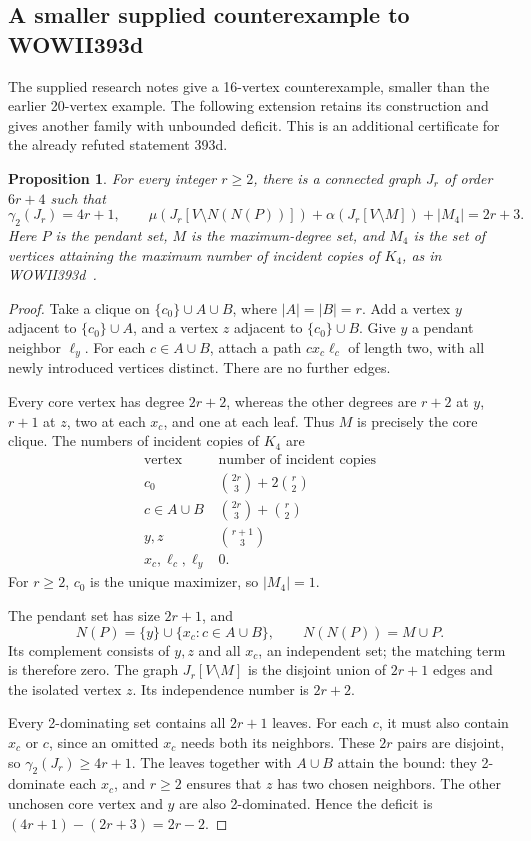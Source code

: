 \documentclass[11pt,a4paper]{article}
\newtheorem{proposition}[theorem]{Proposition}
\theoremstyle{remark}
\begin{document}
\subsection{A smaller supplied counterexample to WOWII393d}
\label{r7:393d}

The supplied research notes give a 16-vertex counterexample, smaller than
the earlier 20-vertex example. The following extension retains its
construction and gives another family with unbounded deficit. This is
an additional certificate for the already refuted statement 393d.

\begin{proposition}\label{r7:family393d}
For every integer $r\ge2$, there is a connected graph $J_r$ of order
$6r+4$ such that
\[
 \gamma_2(J_r)=4r+1,
 \qquad
 \mu(J_r[V\setminus N(N(P))])+\alpha(J_r[V\setminus M])+|M_4|
 =2r+3.
\]
Here $P$ is the pendant set, $M$ is the maximum-degree set, and $M_4$
is the set of vertices attaining the maximum number of incident copies
of $K_4$, as in WOWII393d~\cite{WOWII}.
\end{proposition}
\begin{proof}
Take a clique on $\{c_0\}\cup A\cup B$, where $|A|=|B|=r$.
Add a vertex $y$ adjacent to $\{c_0\}\cup A$, and a vertex $z$
adjacent to $\{c_0\}\cup B$. Give $y$ a pendant neighbor $\ell_y$.
For each $c\in A\cup B$, attach a path $c x_c\ell_c$ of length two,
with all newly introduced vertices distinct. There are no further edges.

Every core vertex has degree $2r+2$, whereas the other degrees are
$r+2$ at $y$, $r+1$ at $z$, two at each $x_c$, and one at each leaf.
Thus $M$ is precisely the core clique. The numbers of incident copies
of $K_4$ are
\[
\begin{array}{c|c}
 \text{vertex}&\text{number of incident copies}\\ \hline
 c_0&\binom{2r}{3}+2\binom r2\\
 c\in A\cup B&\binom{2r}{3}+\binom r2\\
 y,z&\binom{r+1}{3}\\
 x_c,\ell_c,\ell_y&0.
\end{array}
\]
For $r\ge2$, $c_0$ is the unique maximizer, so $|M_4|=1$.

The pendant set has size $2r+1$, and
\[
 N(P)=\{y\}\cup\{x_c:c\in A\cup B\},
 \qquad N(N(P))=M\cup P.
\]
Its complement consists of $y,z$ and all $x_c$, an independent set;
the matching term is therefore zero. The graph $J_r[V\setminus M]$
is the disjoint union of $2r+1$ edges and the isolated vertex $z$.
Its independence number is $2r+2$.

Every 2-dominating set contains all $2r+1$ leaves. For each $c$, it
must also contain $x_c$ or $c$, since an omitted $x_c$ needs both its
neighbors. These $2r$ pairs are disjoint, so $\gamma_2(J_r)\ge4r+1$.
The leaves together with $A\cup B$ attain the bound: they 2-dominate
each $x_c$, and $r\ge2$ ensures that $z$ has two chosen neighbors.
The other unchosen core vertex and $y$ are also 2-dominated. Hence
the deficit is $(4r+1)-(2r+3)=2r-2$.
\end{proof}
\end{document}
